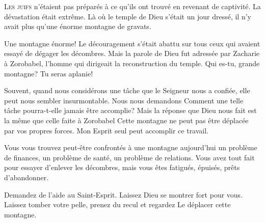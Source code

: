 

\lettrine{L}{es juifs} n'étaient pas préparés à ce qu'ils ont trouvé
 en revenant de captivité. La dévastation était extrême.
 Là où le temple de Dieu s'était un jour dressé,
 il n'y avait plus qu'une énorme montagne de gravats. 

Une montagne énorme! Le découragement s'était abattu sur tous ceux
 qui avaient essayé de dégager les décombres. Mais la parole de Dieu
 fut adressée par Zacharie à Zorobabel, l'homme qui dirigeait
 la reconstruction du temple.
 \Og Qui es-tu, grande montagne? Tu seras aplanie! \Fg{}

Souvent, quand nous considérons une tâche que le Seigneur nous a confiée,
 elle peut nous sembler insurmontable. Nous nous demandons\frcolon{} 
 \Og Comment une telle tâche pourra-t-elle jamais être accomplie? \Fg{}
 Mais la réponse que Dieu nous fait est la même que celle faite à Zorobabel\frcolon{}
 \Og Cette montagne ne peut pas être déplacée par vos propres forces.
 Mon Esprit seul peut accomplir ce travail. \Fg{}

Vous vous trouvez peut-être confrontés à une montagne aujourd'hui
 \ocadr un problème de finances, un problème de santé,
 un problème de relations. Vous avez tout fait pour essayer
 d'enlever les décombres, mais vous êtes fatigués, épuisés, prêts d'abandonner. 


Demandez de l'aide au Saint-Esprit. Laissez Dieu se montrer fort pour vous.
 Laissez tomber votre pelle, prenez du recul et regardez
 Le déplacer cette montagne. 

\dvrule



